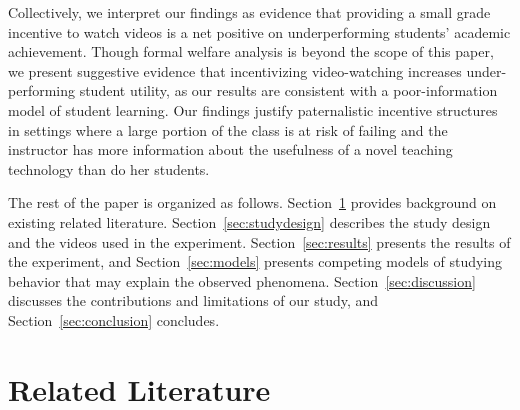 \documentclass[12pt]{article}
\begin{document}
Collectively, we interpret our findings as evidence that providing a small grade incentive to watch videos is a net positive on underperforming students' academic achievement.
Though formal welfare analysis is beyond the scope of this paper, we present suggestive evidence that incentivizing video-watching increases under-performing student utility, as our results are consistent with a poor-information model of student learning.
Our findings justify paternalistic incentive structures in settings where a large portion of the class is at risk of failing and the instructor has more information about the usefulness of a novel teaching technology than do her students.

The rest of the paper is organized as follows.
Section~\ref{sec:background} provides background on existing related literature.
Section~\ref{sec:studydesign} describes the study design and the videos used in the experiment.
Section~\ref{sec:results} presents the results of the experiment, and Section~\ref{sec:models} presents competing models of studying behavior that may explain the observed phenomena.
Section~\ref{sec:discussion} discusses the contributions and limitations of our study, and Section~\ref{sec:conclusion} concludes.


\section{Related Literature} \label{sec:background}
\end{document}
